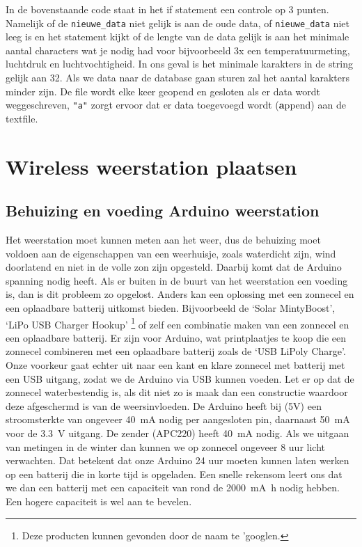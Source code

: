 In de bovenstaande code staat in het if statement een controle op 3
punten. Namelijk of de \verb|nieuwe_data| niet gelijk is aan de oude data, of
\verb|nieuwe_data| niet leeg is en het statement kijkt of de lengte van de data
gelijk is aan het minimale aantal characters wat je nodig had voor
bijvoorbeeld 3x een temperatuurmeting, luchtdruk en luchtvochtigheid. In ons geval is 
het minimale karakters in de string gelijk aan 32. Als we data naar de \hisparc database gaan
sturen zal het aantal karakters minder zijn. 
De file wordt elke keer geopend en gesloten als er data wordt weggeschreven, \verb|"a"|
zorgt ervoor dat er data toegevoegd wordt (\textbf{a}ppend) aan de textfile.

\section{Wireless weerstation plaatsen}

\subsection{Behuizing en voeding Arduino weerstation} 
Het weerstation moet kunnen
meten aan het weer, dus de behuizing moet voldoen aan de eigenschappen
van een weerhuisje, zoals waterdicht zijn, wind doorlatend en niet in de
volle zon zijn opgesteld. Daarbij komt dat de Arduino spanning nodig heeft. Als
er buiten in de buurt van het weerstation een voeding is, dan is dit
probleem zo opgelost. Anders kan een oplossing met een zonnecel
en een oplaadbare batterij uitkomst bieden. Bijvoorbeeld de `Solar
MintyBoost', `LiPo USB Charger Hookup' \footnote{Deze producten kunnen
gevonden door de naam te 'googlen.} of zelf een combinatie maken van een
zonnecel en een oplaadbare batterij. Er zijn voor Arduino, wat
printplaatjes te koop die een zonnecel combineren met een oplaadbare
batterij zoals de `USB LiPoly Charge'. Onze voorkeur gaat echter uit
naar een kant en klare zonnecel met batterij met een USB uitgang, zodat we de Arduino
via USB kunnen voeden. Let er op dat de zonnecel waterbestendig is, als dit niet zo is maak dan een
constructie waardoor deze afgeschermd is van de weersinvloeden.
De Arduino heeft bij (5V) een stroomsterkte van ongeveer \SI{40}{\milli\ampere} nodig per 
aangesloten pin, daarnaast \SI{50}{\milli\ampere} voor de \SI{3,3}{\volt} uitgang.
De zender (APC220) heeft \SI{40}{\milli\ampere} nodig.
Als we uitgaan van metingen in de winter dan kunnen we op zonnecel ongeveer
8 uur licht verwachten. Dat betekent dat onze Arduino 24 uur moeten kunnen laten werken
op een batterij die in korte tijd is opgeladen.
Een snelle rekensom leert ons dat we dan een batterij met een capaciteit van rond
de \SI{2000}{\milli\ampere\hour} nodig hebben. Een hogere capaciteit is wel aan te bevelen.

